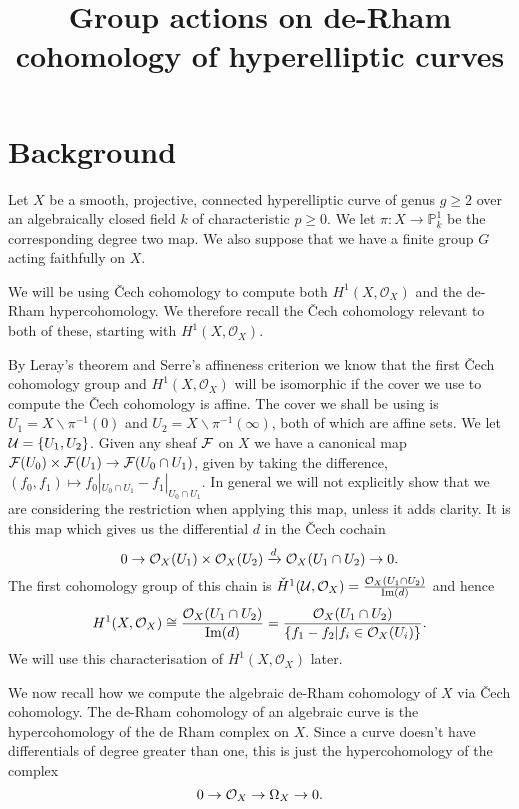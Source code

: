 \documentclass[draft, 11pt]{article} %
\title{Group actions on de-Rham cohomology of hyperelliptic curves}
\author{}
\theoremstyle{plain}
\theoremstyle{remark}
\newcommand{\cO}{{\cal O}}
\newcommand{\cech}{\v{C}ech }
\newcommand{\hone}{H^1(X,\mathcal{O}_X)}
\newcommand{\cechhone}{\check{H}^1(\mathcal U,\mathcal O_X)}
\DeclareMathOperator{\Ima}{Im}
\begin{document}
\maketitle

\listoftodos

\section{Background}

Let $X$ be a smooth, projective, connected hyperelliptic curve of genus $g \geq 2$ over an algebraically closed field $k$ of characteristic $p \geq 0$.
We let $\pi \colon X \rightarrow \mathbb P_k^1$ be the corresponding degree two map.
We also suppose that we have a finite group $G$ acting faithfully on $X$.

We will be using \cech cohomology to compute both $\hone$ and the de-Rham hypercohomology.
We therefore recall the \cech cohomology relevant to both of these, starting with $\hone$.

By Leray's theorem \cite[Thm 5.2.12]{liu} and Serre's affineness criterion \cite[Thm 5.2.23]{liu} we know that the first \cech cohomology group and $\hone$ will be isomorphic if the cover we use to compute the \cech cohomology is affine.
The cover we shall be using is $U_1 = X\backslash \pi^{-1}(0)$ and $U_2 = X\backslash  \pi^{-1}(\infty) $, both of which are affine sets.
We let ${\cal U} = \{ U_1, U_2\}$.
Given any sheaf $\cal F$ on $X$ we have a canonical map ${\cal F}(U_0) \times {\cal F} (U_1) \rightarrow {\cal F}(U_0 \cap U_1)$, given by taking the difference, $(f_0,f_1) \mapsto f_0|_{U_0 \cap U_1} - f_1|_{U_0 \cap U_1}$.
In general we will not explicitly show that we are considering the restriction when applying this map, unless it adds clarity.
It is this map which gives us the differential $d$ in the \cech cochain
\begin{equation*}
0 \rightarrow \cO_X(U_1)\times \cO_X(U_2) \xrightarrow{d} \cO_X(U_1 \cap U_2) \rightarrow 0.
\end{equation*}
The first cohomology group of this chain is $\cechhone = \frac{\cO_X(U_1 \cap U_2)}{\Ima(d)}$ and hence
\begin{equation}
\hone \cong \frac{\cO_X(U_1 \cap U_2)}{\Ima(d)}  
 = \frac{\cO_X(U_1 \cap U_2)}{\{f_1 - f_2 | f_i \in \cO_X(U_i) \}}.
\end{equation}
We will use this characterisation of $\hone$ later.

We now recall how we compute the algebraic de-Rham cohomology of $X$ via \cech cohomology.
The de-Rham cohomology of an algebraic curve is the hypercohomology of the de Rham complex on $X$. 
Since a curve doesn't have differentials of degree greater than one, this is just the hypercohomology of the complex
\begin{equation}\label{res}
0 \rightarrow \cO_X \rightarrow \Omega_X \rightarrow 0.
\end{equation}
\end{document}
